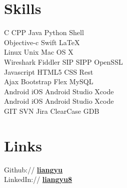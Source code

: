\documentclass[letterpaper]{lyu-resume} %
\begin{document}
\begin{minipage}[t]{0.33\textwidth} %


\section{Skills}

C \textbullet{} CPP \textbullet{} Java \textbullet{} Python \textbullet{} Shell\\
Objective-c \textbullet{} Swift \textbullet{} \LaTeX\ \\ 
Linux \textbullet{} Unix \textbullet{} Mac OS X \\
Wireshark \textbullet{} Fiddler \textbullet{} SIP \textbullet{} SIPP \textbullet{} OpenSSL\\
Javascript \textbullet{} HTML5 \textbullet{} CSS \textbullet{} Rest \\
Ajax \textbullet{} Bootstrap \textbullet{} Flex \textbullet{} MySQL \\ 
Android \textbullet{} iOS \textbullet{} Android Studio \textbullet{} Xcode \\
Android \textbullet{} iOS \textbullet{} Android Studio \textbullet{} Xcode \\
GIT \textbullet{} SVN \textbullet{} Jira \textbullet{} ClearCase \textbullet{} GDB

\sectionspace %


\section{Links} 

Github:// \href{https://github.com/liangyu}{\bf liangyu} \\
LinkedIn:// \href{https://www.linkedin.com/in/liangyuneu}{\bf liangyu8} \\

\sectionspace %




\end{minipage}
\end{document}
